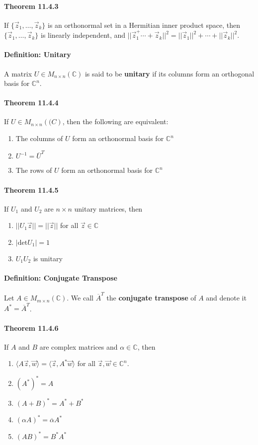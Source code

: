 \documentclass[10pt,letter]{article}
\begin{document}
\paragraph{Theorem 11.4.3}
If $\{\vec{z}_1,\ldots,\vec{z}_k\}$ is an orthonormal set in a Hermitian inner product space, then $\{\vec{z}_1,\ldots,\vec{z}_k\}$ is linearly independent, and $||\vec{z}_1^+\cdots+\vec{z}_k||^2=||\vec{z}_1||^2+\cdots+||\vec{z}_k||^2$. 
\paragraph{Definition: Unitary}
A matrix $U\in M_{n\times n}(\mathbb{C})$ is said to be \textbf{unitary} if its columns form an orthogonal basis for $\mathbb{C}^n$. 
\paragraph{Theorem 11.4.4}
If $U\in M_{n\times n}(\mathbb(C)$, then the following are equivalent: 
\begin{enumerate}
    \item The columns of $U$ form an orthonormal basis for $\mathbb{C}^n$ 
    \item $U^{-1}=\overline{U}^T$ 
    \item The rows of $U$ form an orthonormal basis for $\mathbb{C}^n$
\end{enumerate}

\paragraph{Theorem 11.4.5}
If $U_1$ and $U_2$ are $n\times n$ unitary matrices, then \begin{enumerate}
    \item $||U_1\vec{z}||=||\vec{z}||$ for all $\vec{z}\in\mathbb{C}$ 
    \item $|\text{det}U_1|=1$ 
    \item $U_1U_2$ is unitary
\end{enumerate}
\paragraph{Definition: Conjugate Transpose}
Let $A\in M_{m\times n}(\mathbb{C})$. We call $\overline{A}^T$ the \textbf{conjugate transpose} of $A$ and denote it $A^*=\overline{A}^T$. 
\paragraph{Theorem 11.4.6}
If $A$ and $B$ are complex matrices and $\alpha\in\mathbb{C}$, then \begin{enumerate}
    \item $\langle A\vec{z},\vec{w}\rangle=\langle\vec{z},A^*\vec{w}\rangle$ for all $\vec{z},\vec{w}\in\mathbb{C}^n$.  
    \item $(A^*)^*=A$ 
    \item $(A+B)^*=A^*+B^*$ 
    \item $(\alpha A)^*=\overline{\alpha}A^*$ 
    \item $(AB)^*=B^*A^*$
\end{enumerate}
\end{document}

